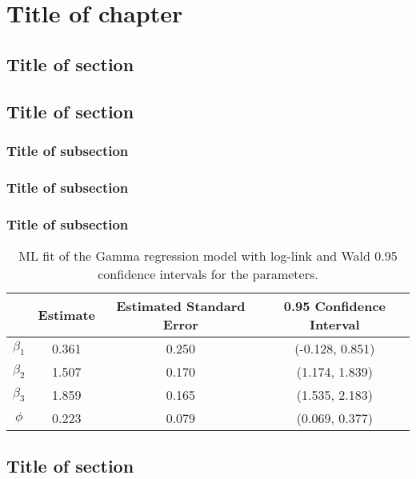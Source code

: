 \chapter{Title of chapter}

\fancyhead[RO,LE]{\thepage}

\setlength{\parskip}{0.5pt}

\bigskip

\section{Title of section} 
\noindent

\section{Title of section}
\noindent

\subsection{Title of subsection}
\noindent


\subsection{Title of subsection}
\noindent


\subsection{Title of subsection}
\noindent

\begin{table}[b]\centering\vspace{0.5cm}
	\caption{\label{tab:MLfit} ML fit of the Gamma regression model with log-link and Wald 0.95 confidence intervals for the parameters.}
	\medskip	
	\begin{tabular}{cccc}
		\toprule
		& Estimate & Estimated Standard Error & 0.95 Confidence Interval \\
		\midrule
		$\beta_1$ & 0.361 & 0.250 & (-0.128,  0.851) \\ 
		
		$\beta_2$ & 1.507 & 0.170 & (1.174, 1.839)\\
		
		$\beta_3$ & 1.859 & 0.165 & (1.535, 2.183)\\
		
		$\phi$ & 0.223 & 0.079 & (0.069, 0.377)\\
		\bottomrule
	\end{tabular}
\end{table}

\section{Title of section}
\noindent

